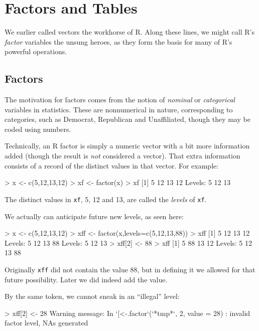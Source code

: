 \chapter{Factors and Tables}
\label{chap:factab}

We earlier called vectors the workhorse of R.  Along these lines, we
might call R's {\it factor} variables the unsung heroes, as they form
the basis for many of R's powerful operations.

\section{Factors}

The motivation for factors comes from the notion of {\it nominal} or {\it
categorical} variables in statistics.  These are nonnumerical in nature,
corresponding to categories, such as Democrat, Republican and Unaffiliated,
though they may be coded using numbers.

Technically, an R factor is simply a numeric vector with a bit
more information added (though the result is {\it not} considered a
vector).  That extra information consists of a record of the distinct
values in that vector.  For example:

\begin{Code}
> x <- c(5,12,13,12)
> xf <- factor(x)
> xf
[1] 5  12 13 12
Levels: 5 12 13
\end{Code}

\noindent
The distinct values in {\tt xf}, 5, 12 and 13, are called the {\it
levels} of {\tt xf}.  

We actually can anticipate future new levels, as seen here:

\begin{Code}
> x <- c(5,12,13,12)
> xff <- factor(x,levels=c(5,12,13,88))
> xff
[1] 5  12 13 12
Levels: 5 12 13 88
Levels: 5 12 13
> xff[2] <- 88
> xff
[1] 5  88 13 12
Levels: 5 12 13 88
\end{Code}

\noindent
Originally {\tt xff} did not contain the value 88, but in defining it we
allowed for that future possibility.  Later we did indeed add the value.

By the same token, we cannot sneak in an ``illegal'' level:

\begin{Code}
> xff[2] <- 28
Warning message:
In `[<-.factor`(`*tmp*`, 2, value = 28) :
  invalid factor level, NAs generated
\end{Code}

